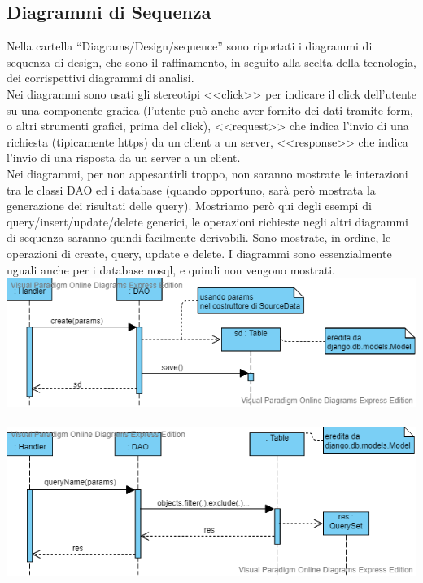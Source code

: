 \subsection{Diagrammi di Sequenza}
Nella cartella ``Diagrams/Design/sequence'' sono riportati i diagrammi di sequenza di design, che sono il raffinamento, in seguito alla scelta della tecnologia, dei corrispettivi diagrammi di analisi.\\
Nei diagrammi sono usati gli stereotipi <<click>> per indicare il click dell'utente su una componente grafica (l'utente può anche aver fornito dei dati tramite form, o altri strumenti grafici, prima del click), <<request>> che indica l'invio di una richiesta (tipicamente https) da un client a un server, <<response>> che indica l'invio di una risposta da un server a un client. \\
Nei diagrammi, per non appesantirli troppo, non saranno mostrate le interazioni tra le classi DAO ed i database (quando opportuno, sarà però mostrata la generazione dei risultati delle query). Mostriamo però qui degli esempi di query/insert/update/delete generici, le operazioni richieste negli altri diagrammi di sequenza saranno quindi facilmente derivabili. Sono mostrate, in ordine, le operazioni di create, query, update e delete. I diagrammi sono essenzialmente uguali anche per i database nosql, e quindi non vengono mostrati.\\
\includegraphics[scale=0.7]{../Contents/Diagrams/Design/sequence/DAO/create.png}\\ \\
\includegraphics[scale=0.7]{../Contents/Diagrams/Design/sequence/DAO/query.png}\\ \\
